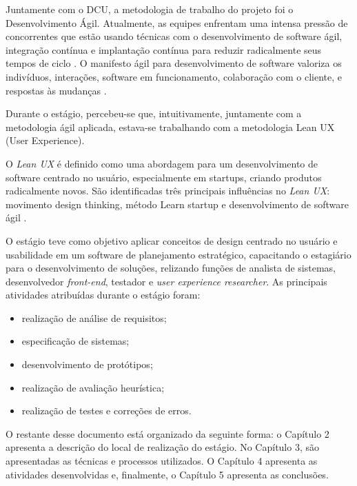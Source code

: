 Juntamente com o DCU, a metodologia de trabalho do projeto foi o Desenvolvimento Ágil. Atualmente, as equipes enfrentam uma intensa pressão de concorrentes que estão usando técnicas com o desenvolvimento de software ágil, integração contínua e implantação contínua para reduzir radicalmente seus tempos de ciclo \cite{gothelf2013lean}. O manifesto ágil para desenvolvimento de software valoriza os indivíduos, interações, software em funcionamento, colaboração com o cliente, e respostas às mudanças \cite{robbinsd:beck2001agile}. 

Durante o estágio, percebeu-se que, intuitivamente, juntamente com a metodologia ágil aplicada, estava-se trabalhando com a metodologia Lean UX (User Experience). 

O \textit{Lean UX} é definido como uma abordagem para um desenvolvimento de software centrado no usuário, especialmente em startups, criando produtos radicalmente novos. São identificadas três principais influências no \textit{Lean UX}: movimento design thinking, método Learn startup e desenvolvimento de software ágil  \cite{gothelf2013lean}.

O  estágio teve como objetivo aplicar conceitos de design centrado no usuário e usabilidade em um software de planejamento estratégico, capacitando o estagiário para o desenvolvimento de soluções, relizando funções de analista de sistemas, desenvolvedor \textit{front-end}, testador e \textit{user experience researcher}. As principais atividades atribuídas durante o estágio foram:

\begin{itemize}

\item realização de análise de requisitos;

\item especificação de sistemas;

\item desenvolvimento de protótipos;

\item realização de avaliação heurística;

\item realização de testes e correções de erros.

\end{itemize}

O restante desse documento está organizado da seguinte forma: o Capítulo 2 apresenta a descrição do local de realização do estágio.  No Capítulo 3, são apresentadas as técnicas e processos utilizados.  O Capítulo 4 apresenta as atividades desenvolvidas e, finalmente, o Capítulo 5 apresenta as conclusões.
